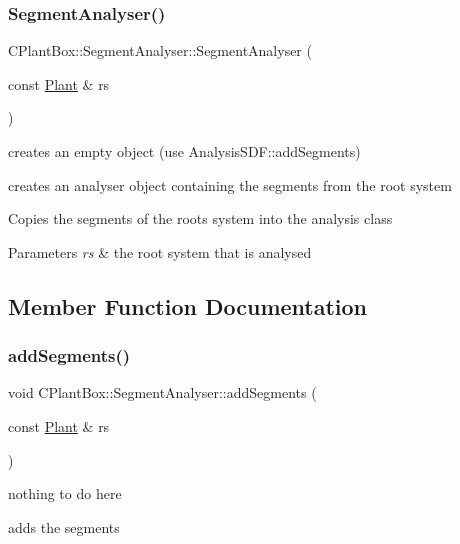 \subsubsection{\texorpdfstring{Segment\+Analyser()}{SegmentAnalyser()}}
{\footnotesize\ttfamily C\+Plant\+Box\+::\+Segment\+Analyser\+::\+Segment\+Analyser (\begin{DoxyParamCaption}\item[{const \hyperlink{classCPlantBox_1_1Plant}{Plant} \&}]{rs }\end{DoxyParamCaption})}



creates an empty object (use Analysis\+S\+D\+F\+::add\+Segments) 

creates an analyser object containing the segments from the root system

Copies the segments of the roots system into the analysis class


\begin{DoxyParams}{Parameters}
{\em rs} & the root system that is analysed \\
\hline
\end{DoxyParams}


\subsection{Member Function Documentation}
\mbox{\label{classCPlantBox_1_1SegmentAnalyser_a3ff7165b8d0201bddee92b3338b95839}} 
\subsubsection{\texorpdfstring{add\+Segments()}{addSegments()}\hspace{0.1cm}{\footnotesize\ttfamily [1/2]}}
{\footnotesize\ttfamily void C\+Plant\+Box\+::\+Segment\+Analyser\+::add\+Segments (\begin{DoxyParamCaption}\item[{const \hyperlink{classCPlantBox_1_1Plant}{Plant} \&}]{rs }\end{DoxyParamCaption})}



nothing to do here 

adds the segments

